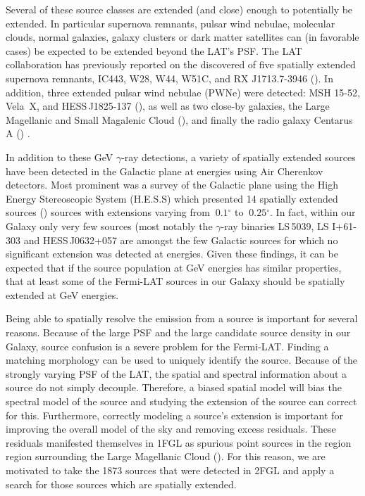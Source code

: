 \documentclass[12pt,preprint]{aastex}
\newcommand{\gev}{\text{GeV}\xspace}
\newcommand{\tev}{\text{TeV}\xspace}
\renewcommand{\deg}{\ensuremath{^\circ}\xspace}
\begin{document}
Several of these source classes are extended (and close) enough to
potentially be extended. In particular supernova remnants, pulsar wind
nebulae, molecular clouds, normal galaxies, galaxy clusters or dark
matter satellites can (in favorable cases) be expected to be extended
beyond the LAT's PSF. The LAT collaboration has previously reported on
the discovered of five spatially extended supernova remnants, IC443,
W28, W44, W51C, and RX J1713.7-3946
(\cite{ic443,w28,w44,w51c,rx_j1713_lat}). In addition, three extended
pulsar wind nebulae (PWNe) were detected: MSH 15-52, Vela~X, and
HESS\,J1825-137 (\cite{msh1552,velax,fermi_hess_j1825}), as well as
two close-by galaxies, the Large Magellanic and Small Magalenic Cloud
(\cite{lmc,smc}), and finally the radio galaxy Centarus A
(\cite{cen_a_lat}) .

In addition to these GeV $\gamma$-ray detections, a variety of
spatially extended sources have been detected in the Galactic plane at
\tev energies using Air Cherenkov detectors. Most prominent was a
survey of the Galactic plane using the High Energy Stereoscopic System
(H.E.S.S) which presented 14 spatially extended sources
(\cite{hess_plane_survey}) sources with extensions varying from
$~0.1\deg$ to $~0.25\deg$. In fact, within our Galaxy only very few
sources (most notably the $\gamma$-ray binaries
LS\,5039\cite{HESSLS5039}, LS I+61-303\cite{MAGICLSI, VERITASLSI} and
HESS\,J0632+057\cite{HESS0632} are amongst the few Galactic sources
for which no significant extension was detected at \tev
energies. Given these findings, it can be expected that if the source
population at GeV energies has similar properties, that at least some
of the Fermi-LAT sources in our Galaxy should be spatially extended at
GeV energies.

Being able to spatially resolve the \gev emission from a source is
important for several reasons. Because of the large PSF and the large
candidate source density in our Galaxy, source confusion is a severe
problem for the Fermi-LAT. Finding a matching morphology can be used
to uniquely identify the source.  Because of the strongly varying PSF
of the LAT, the spatial and spectral information about a source do not
simply decouple. Therefore, a biased spatial model will bias the
spectral model of the source and studying the extension of the source
can correct for this.  Furthermore, correctly modeling a source's
extension is important for improving the overall model of the sky and
removing excess residuals.  These residuals manifested themselves in
1FGL as spurious point sources in the region region surrounding the
Large Magellanic Cloud (\cite{first_cat}).  For this reason, we are
motivated to take the 1873 sources that were detected in 2FGL and
apply a search for those sources which are spatially extended.
\end{document}
